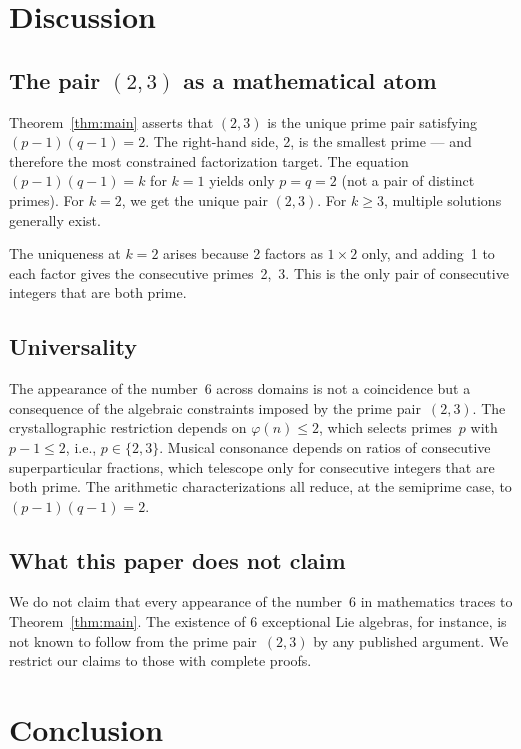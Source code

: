 \documentclass{amsart}
\begin{document}
\section{Discussion}

\subsection{The pair $(2,3)$ as a mathematical atom}

Theorem~\ref{thm:main} asserts that $(2, 3)$ is the unique prime pair satisfying $(p-1)(q-1) = 2$. The right-hand side, 2, is the smallest prime --- and therefore the most constrained factorization target. The equation $(p-1)(q-1) = k$ for $k = 1$ yields only $p = q = 2$ (not a pair of distinct primes). For $k = 2$, we get the unique pair $(2,3)$. For $k \geq 3$, multiple solutions generally exist.

The uniqueness at $k = 2$ arises because 2 factors as $1 \times 2$ only, and adding~1 to each factor gives the consecutive primes~2,~3. This is the only pair of consecutive integers that are both prime.

\subsection{Universality}

The appearance of the number~6 across domains is not a coincidence but a consequence of the algebraic constraints imposed by the prime pair~$(2,3)$. The crystallographic restriction depends on $\varphi(n) \leq 2$, which selects primes~$p$ with $p - 1 \leq 2$, i.e., $p \in \{2,3\}$. Musical consonance depends on ratios of consecutive superparticular fractions, which telescope only for consecutive integers that are both prime. The arithmetic characterizations all reduce, at the semiprime case, to $(p-1)(q-1) = 2$.

\subsection{What this paper does not claim}

We do not claim that every appearance of the number~6 in mathematics traces to Theorem~\ref{thm:main}. The existence of 6 exceptional Lie algebras, for instance, is not known to follow from the prime pair~$(2,3)$ by any published argument. We restrict our claims to those with complete proofs.

\section{Conclusion}
\end{document}
